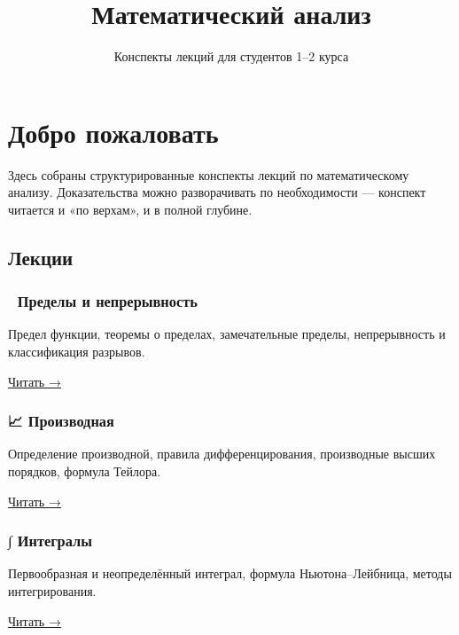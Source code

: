\documentclass[
  russian,
  12pt,
  a4paper,
]{article}
\title{Математический анализ}
\subtitle{Конспекты лекций для студентов 1--2 курса}
\author{}
\date{}
\theoremstyle{definition}
\theoremstyle{remark}
\begin{document}
\maketitle


\section{Добро
пожаловать}\label{ux434ux43eux431ux440ux43e-ux43fux43eux436ux430ux43bux43eux432ux430ux442ux44c}

Здесь собраны структурированные конспекты лекций по математическому
анализу. Доказательства можно разворачивать по необходимости ---
конспект читается и «по верхам», и в полной глубине.

\subsection*{Лекции}\label{ux43bux435ux43aux446ux438ux438}

\subsubsection{📐 Пределы и
непрерывность}\label{ux43fux440ux435ux434ux435ux43bux44b-ux438-ux43dux435ux43fux440ux435ux440ux44bux432ux43dux43eux441ux442ux44c}

Предел функции, теоремы о пределах, замечательные пределы, непрерывность
и классификация разрывов.

\href{lectures/01-limits.qmd}{Читать →}

\subsubsection{📈
Производная}\label{ux43fux440ux43eux438ux437ux432ux43eux434ux43dux430ux44f}

Определение производной, правила дифференцирования, производные высших
порядков, формула Тейлора.

\href{lectures/02-derivatives.qmd}{Читать →}

\subsubsection{∫
Интегралы}\label{ux438ux43dux442ux435ux433ux440ux430ux43bux44b}

Первообразная и неопределённый интеграл, формула Ньютона--Лейбница,
методы интегрирования.

\href{lectures/03-integrals.qmd}{Читать →}
\end{document}
